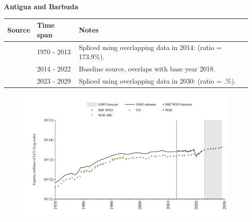\documentclass[12pt,a4paper,landscape]{article}
\begin{document}
\begin{adjustbox}{max totalsize={\paperwidth}{\paperheight},center}
\begin{minipage}[t][\textheight][t]{\textwidth}
\vspace*{0.5cm}
{}
\begin{center}
{\Large\bfseries Antigua and Barbuda}
\end{center}
\vspace{0.5cm}
\begin{table}[H]
\centering
\small
\begin{tabular}{|l|l|l|}
\hline
\textbf{Source} & \textbf{Time span} & \textbf{Notes} \\
\hline
\rowcolor{white}\cite{UN}& 1970 - 2013 &Spliced using overlapping data in 2014: (ratio = 173.9\%).\\
\rowcolor{lightgray}\cite{WDI}& 2014 - 2022 &Baseline source, overlaps with base year 2018.\\
\rowcolor{white}\cite{IMF_WEO_forecast}& 2023 - 2029 &Spliced using overlapping data in 2030: (ratio = .\%).\\
\hline
\end{tabular}
\end{table}
\begin{figure}[H]
\centering
\includegraphics[width=\textwidth,height=0.6\textheight,keepaspectratio]{graphs/ATG_exports.pdf}
\end{figure}
\end{minipage}
\end{adjustbox}
\end{document}
